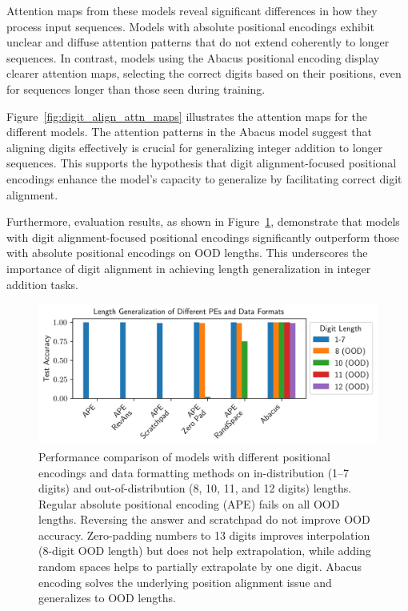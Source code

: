 Attention maps from these models reveal significant differences in how they process input sequences. Models with absolute positional encodings exhibit unclear and diffuse attention patterns that do not extend coherently to longer sequences. In contrast, models using the Abacus positional encoding display clearer attention maps, selecting the correct digits based on their positions, even for sequences longer than those seen during training.

Figure~\ref{fig:digit_align_attn_maps} illustrates the attention maps for the different models. The attention patterns in the Abacus model suggest that aligning digits effectively is crucial for generalizing integer addition to longer sequences. This supports the hypothesis that digit alignment-focused positional encodings enhance the model's capacity to generalize by facilitating correct digit alignment.

Furthermore, evaluation results, as shown in Figure~\ref{fig:pe_results}, demonstrate that models with digit alignment-focused positional encodings significantly outperform those with absolute positional encodings on OOD lengths. This underscores the importance of digit alignment in achieving length generalization in integer addition tasks.

\begin{figure}[h!]
    \centering
    \includegraphics[width=\textwidth]{fig/pe_results.png}
    \caption{Performance comparison of models with different positional encodings and data formatting methods on in-distribution (1--7 digits) and out-of-distribution (8, 10, 11, and 12 digits) lengths. Regular absolute positional encoding (APE) fails on all OOD lengths. Reversing the answer and scratchpad do not improve OOD accuracy. Zero-padding numbers to 13 digits improves interpolation (8-digit OOD length) but does not help extrapolation, while adding random spaces helps to partially extrapolate by one digit. Abacus encoding solves the underlying position alignment issue and generalizes to OOD lengths.}
    \label{fig:pe_results}
\end{figure}

